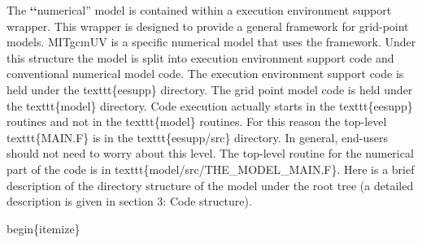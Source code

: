 \documentclass[letterpaper,10pt,english]{sphinxmanual}
\begin{document}
The {\color{red}\bfseries{}{}`{}`}numerical'' model is contained within a execution environment
support wrapper. This wrapper is designed to provide a general
framework for grid-point models. MITgcmUV is a specific numerical
model that uses the framework. Under this structure the model is split
into execution environment support code and conventional numerical
model code. The execution environment support code is held under the
texttt\{eesupp\} directory. The grid point model code is held under the
texttt\{model\} directory. Code execution actually starts in the
texttt\{eesupp\} routines and not in the texttt\{model\} routines. For
this reason the top-level texttt\{MAIN.F\} is in the
texttt\{eesupp/src\} directory. In general, end-users should not need
to worry about this level. The top-level routine for the numerical
part of the code is in texttt\{model/src/THE\_MODEL\_MAIN.F\}. Here is
a brief description of the directory structure of the model under the
root tree (a detailed description is given in section 3: Code
structure).

begin\{itemize\}
\end{document}
